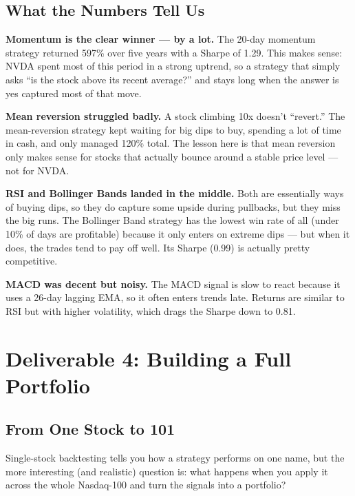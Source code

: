 \documentclass[11pt,a4paper]{article}
\begin{document}
\subsection{What the Numbers Tell Us}

\textbf{Momentum is the clear winner --- by a lot.}
The 20-day momentum strategy returned 597\% over five years with a Sharpe of 1.29.
This makes sense: NVDA spent most of this period in a strong uptrend, so a strategy
that simply asks ``is the stock above its recent average?'' and stays long when the
answer is yes captured most of that move.

\textbf{Mean reversion struggled badly.}
A stock climbing 10x doesn't ``revert.'' The mean-reversion strategy kept waiting
for big dips to buy, spending a lot of time in cash, and only managed 120\% total.
The lesson here is that mean reversion only makes sense for stocks that actually
bounce around a stable price level --- not for NVDA.

\textbf{RSI and Bollinger Bands landed in the middle.}
Both are essentially ways of buying dips, so they do capture some upside during
pullbacks, but they miss the big runs. The Bollinger Band strategy has the lowest
win rate of all (under 10\% of days are profitable) because it only enters on extreme
dips --- but when it does, the trades tend to pay off well. Its Sharpe (0.99) is
actually pretty competitive.

\textbf{MACD was decent but noisy.}
The MACD signal is slow to react because it uses a 26-day lagging EMA, so it
often enters trends late. Returns are similar to RSI but with higher volatility,
which drags the Sharpe down to 0.81.

\section{Deliverable 4: Building a Full Portfolio}

\subsection{From One Stock to 101}

Single-stock backtesting tells you how a strategy performs on one name,
but the more interesting (and realistic) question is: what happens when
you apply it across the whole Nasdaq-100 and turn the signals into a portfolio?
\end{document}
